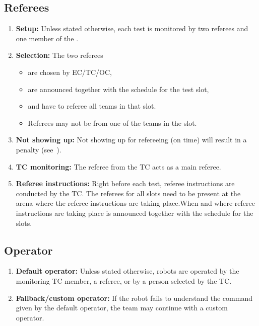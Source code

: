 \subsection{Referees}
\label{rule:referees}
\begin{enumerate}
	\item \textbf{Setup:} Unless stated otherwise, each test is monitored by two referees and one member of the .
	\item \textbf{Selection:} The two referees
	\begin{itemize}
		\item are chosen by EC/TC/OC,
		\item are announced together with the schedule for the test slot,
		\item and have to referee all teams in that slot.
		\item Referees may not be from one of the teams in the slot.
	\end{itemize}
	\item \textbf{Not showing up:} Not showing up for refereeing (on time) will result in a penalty (see~).
	\item \textbf{TC monitoring:} The referee from the TC acts as a main referee.
	\item \textbf{Referee instructions:} Right before each test, referee instructions are conducted by the TC. The referees for all slots need to be present at the arena where the referee instructions are taking place.When and where referee instructions are taking place is announced together with the schedule for the slots.
\end{enumerate}


\subsection{Operator}
\label{rule:operator}
\begin{enumerate}
	\item \textbf{Default operator:} Unless stated otherwise, robots are operated by the monitoring TC member, a referee, or by a person selected by the TC.
	\item \textbf{Fallback/custom operator:} If the robot fails to understand the command given by the default operator, the team may continue with a custom operator.
\end{enumerate}



